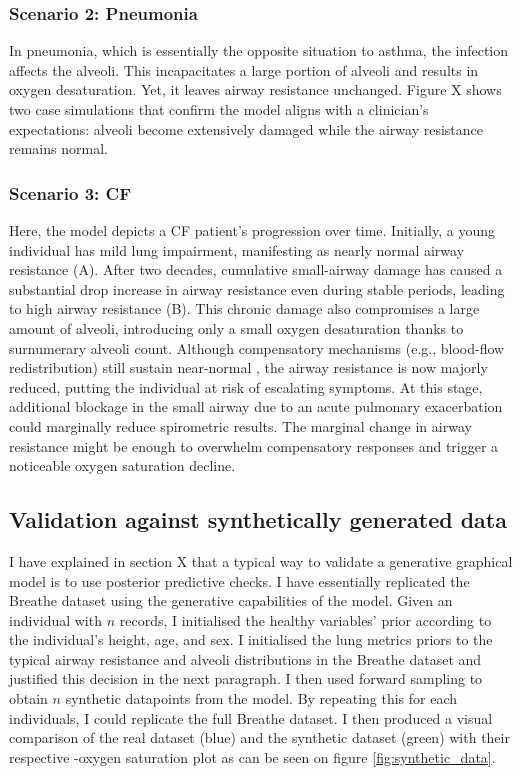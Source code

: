 \subsubsection{Scenario 2: Pneumonia}
In pneumonia, which is essentially the opposite situation to asthma, the infection affects the alveoli. This incapacitates a large portion of alveoli and results in oxygen desaturation. Yet, it leaves airway resistance unchanged. Figure X shows two case simulations that confirm the model aligns with a clinician's expectations: alveoli become extensively damaged while the airway resistance remains normal.

\subsubsection{Scenario 3: CF}
Here, the model depicts a CF patient's progression over time. Initially, a young individual has mild lung impairment, manifesting as nearly normal airway resistance (A). After two decades, cumulative small-airway damage has caused a substantial drop increase in airway resistance even during stable periods, leading to high airway resistance (B). This chronic damage also compromises a large amount of alveoli, introducing only a small oxygen desaturation thanks to surnumerary alveoli count. Although compensatory mechanisms (e.g., blood-flow redistribution) still sustain near-normal \PA, the airway resistance is now majorly reduced, putting the individual at risk of escalating symptoms. At this stage, additional blockage in the small airway due to an acute pulmonary exacerbation could marginally reduce spirometric results. The marginal change in airway resistance might be enough to overwhelm compensatory responses and trigger a noticeable oxygen saturation decline.


\subsection{Validation against synthetically generated data}
I have explained in section X that a typical way to validate a generative graphical model is to use posterior predictive checks. I have essentially replicated the Breathe dataset using the generative capabilities of the model. Given an individual with $n$ records, I initialised the healthy variables' prior according to the individual's height, age, and sex. I initialised the lung metrics priors to the typical airway resistance and alveoli distributions in the Breathe dataset and justified this decision in the next paragraph. I then used forward sampling to obtain $n$ synthetic datapoints from the model. By repeating this for each individuals, I could replicate the full Breathe dataset. I then produced a visual comparison of the real dataset (blue) and the synthetic dataset (green) with their respective \F-oxygen saturation plot as can be seen on figure \ref{fig:synthetic_data}. 

